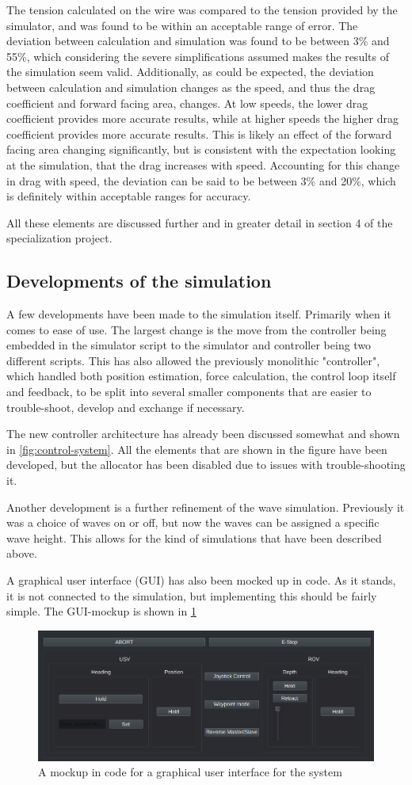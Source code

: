 \documentclass[class=article, crop=false]{standalone}
\begin{document}
The tension calculated on the wire was compared to the tension provided by the simulator, and was found to be within an acceptable range of error. The deviation between calculation and simulation was found to be between 3\% and 55\%, which considering the severe simplifications assumed makes the results of the simulation seem valid. Additionally, as could be expected, the deviation between calculation and simulation changes as the speed, and thus the drag coefficient and forward facing area, changes. At low speeds, the lower drag coefficient provides more accurate results, while at higher speeds the higher drag coefficient provides more accurate results. This is likely an effect of the forward facing area changing significantly, but is consistent with the expectation looking at the simulation, that the drag increases with speed. Accounting for this change in drag with speed, the deviation can be said to be between 3\% and 20\%, which is definitely within acceptable ranges for accuracy.

All these elements are discussed further and in greater detail in section 4 of the specialization project.

\subsection{Developments of the simulation}
A few developments have been made to the simulation itself. Primarily when it comes to ease of use. The largest change is the move from the controller being embedded in the simulator script to the simulator and controller being two different scripts. This has also allowed the previously monolithic "controller", which handled both position estimation, force calculation, the control loop itself and feedback, to be split into several smaller components that are easier to trouble-shoot, develop and exchange if necessary.

The new controller architecture has already been discussed somewhat and shown in \cref{fig:control-system}. All the elements that are shown in the figure have been developed, but the allocator has been disabled due to issues with trouble-shooting it.

Another development is a further refinement of the wave simulation. Previously it was a choice of waves on or off, but now the waves can be assigned a specific wave height. This allows for the kind of simulations that have been described above.

A graphical user interface (GUI) has also been mocked up in code. As it stands, it is not connected to the simulation, but implementing this should be fairly simple. The GUI-mockup is shown in \cref{fig:gui}

\begin{figure}
    \centering
    \includegraphics{gui}
    \caption{A mockup in code for a graphical user interface for the system}
    \label{fig:gui}
\end{figure}
\end{document}
